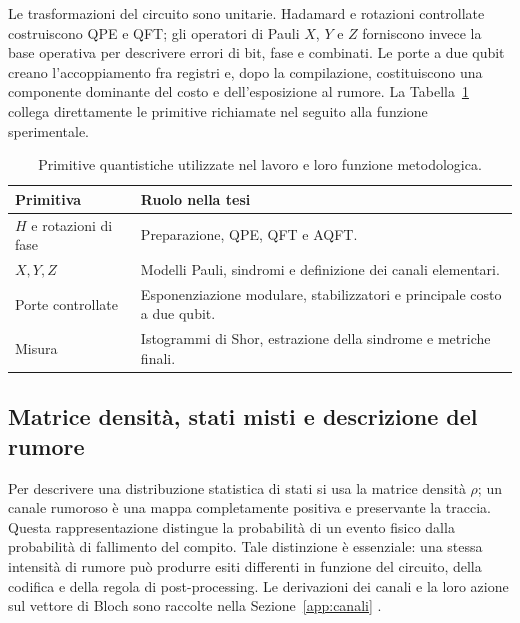 Le trasformazioni del circuito sono unitarie. Hadamard e rotazioni controllate costruiscono QPE e QFT; gli operatori di Pauli $X$, $Y$ e $Z$ forniscono invece la base operativa per descrivere errori di bit, fase e combinati. Le porte a due qubit creano l'accoppiamento fra registri e, dopo la compilazione, costituiscono una componente dominante del costo e dell'esposizione al rumore. La Tabella~\ref{tab:finale_3_1} collega direttamente le primitive richiamate nel seguito alla funzione sperimentale.

\begin{table}[!htbp]
\centering
\small

\begin{tabularx}{\textwidth}{@{}lX@{}}
\toprule
\textbf{Primitiva} & \textbf{Ruolo nella tesi} \\
\midrule
$H$ e rotazioni di fase & Preparazione, QPE, QFT e AQFT. \\
\addlinespace[0.3em]
$X,Y,Z$ & Modelli Pauli, sindromi e definizione dei canali elementari. \\
\addlinespace[0.3em]
Porte controllate & Esponenziazione modulare, stabilizzatori e principale costo a due qubit. \\
\addlinespace[0.3em]
Misura & Istogrammi di Shor, estrazione della sindrome e metriche finali. \\
\bottomrule
\end{tabularx}
\caption{Primitive quantistiche utilizzate nel lavoro e loro funzione metodologica.}\label{tab:finale_3_1}

\end{table}

\subsection{Matrice densità, stati misti e descrizione del rumore}\label{sec:finale_3_1_3}

Per descrivere una distribuzione statistica di stati si usa la matrice densità $\rho$; un canale rumoroso è una mappa completamente positiva e preservante la traccia. Questa rappresentazione distingue la probabilità di un evento fisico dalla probabilità di fallimento del compito. Tale distinzione è essenziale: una stessa intensità di rumore può produrre esiti differenti in funzione del circuito, della codifica e della regola di post-processing. Le derivazioni dei canali e la loro azione sul vettore di Bloch sono raccolte nella Sezione~\ref{app:canali} \cite{nielsenChuang2000,zurek2003}.

